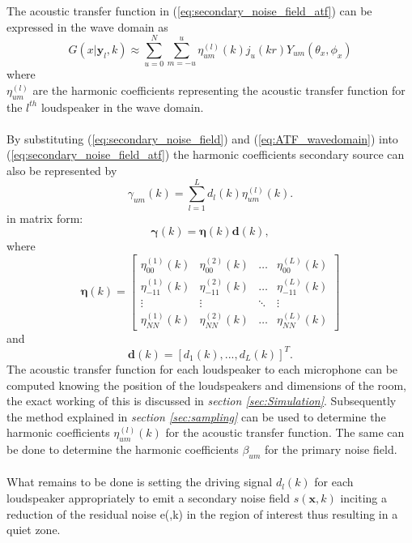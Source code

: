The acoustic transfer function in (\ref{eq:secondary_noise_field_atf}) can be expressed in the wave domain as \cite{Betlehem2005}
\begin{equation}
    G(x|\mathbf{y}_l,k) \approx \sum_{u=0}^N \sum_{m=-u}^u\eta^{(l)}_{um}(k)j_u(kr)Y_{um}(\theta_x,\phi_x)
    \label{eq:ATF_wavedomain}
\end{equation}
where\\
$\eta^{(l)}_{um}$ are the harmonic coefficients representing the acoustic transfer function for the $l^{th}$ loudspeaker in the wave domain.\\\\
By substituting (\ref{eq:secondary_noise_field}) and (\ref{eq:ATF_wavedomain}) into (\ref{eq:secondary_noise_field_atf}) the harmonic coefficients secondary source can also be represented by
\begin{equation}
    \gamma_{um}(k) = \sum_{l=1}^Ld_l(k)\eta_{um}^{(l)}(k).
\end{equation}
in matrix form:
\begin{equation}
    {\boldsymbol{\gamma}}(k)=\boldsymbol{\eta}(k) \mathbf{d}(k),
\end{equation}
where\\
\begin{equation}
    \boldsymbol{\eta}(k) = 
    \begin{bmatrix}
        \eta_{00}^{(1)}(k) & \eta_{00}^{(2)}(k) & \hdots & \eta_{00}^{(L)}(k)\\
        \eta_{-11}^{(1)}(k) & \eta_{-11}^{(2)}(k) & \hdots & \eta_{-11}^{(L)}(k)\\
        \vdots & \vdots & \ddots & \vdots\\
        \eta_{NN}^{(1)}(k) & \eta_{NN}^{(2)}(k) & \hdots & \eta_{NN}^{(L)}(k)
    \end{bmatrix}
\end{equation}
and\\
\begin{equation}
    \boldsymbol{d}(k) = [d_1(k),...,d_L(k)]^T.
\end{equation}
The acoustic transfer function for each loudspeaker to each microphone can be computed knowing the position of the loudspeakers and dimensions of the room, the exact working of this is discussed in \textit{section \ref{sec:Simulation}}. Subsequently the method explained in \textit{section \ref{sec:sampling}} can be used to determine the harmonic coefficients $\eta^{(l)}_{um}(k)$ for the acoustic transfer function. The same can be done to determine the harmonic coefficients $\beta_{um}$ for the primary noise field.\\\\
What remains to be done is setting the driving signal $d_l(k)$ for each loudspeaker appropriately to emit a secondary noise field $s(\mathbf{x},k)$ inciting a reduction of the residual noise e(,k) in the region of interest thus resulting in a quiet zone.


